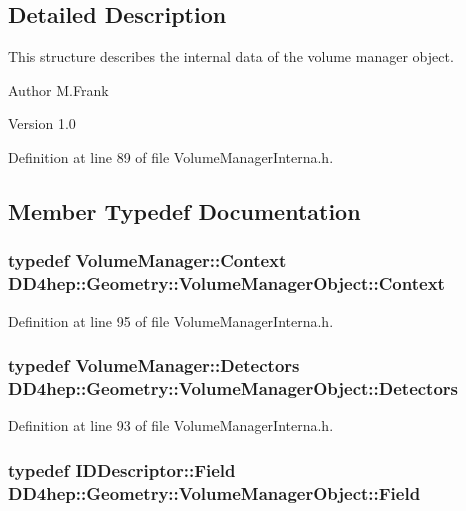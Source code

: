 \subsection{Detailed Description}
This structure describes the internal data of the volume manager object. \begin{DoxyAuthor}{Author}
M.Frank 
\end{DoxyAuthor}
\begin{DoxyVersion}{Version}
1.0 
\end{DoxyVersion}


Definition at line 89 of file VolumeManagerInterna.h.

\subsection{Member Typedef Documentation}
\hypertarget{class_d_d4hep_1_1_geometry_1_1_volume_manager_object_ac975f498c99a0933b0b5911d4fb721b3}{
\subsubsection[{Context}]{\setlength{\rightskip}{0pt plus 5cm}typedef {\bf VolumeManager::Context} {\bf DD4hep::Geometry::VolumeManagerObject::Context}}}
\label{class_d_d4hep_1_1_geometry_1_1_volume_manager_object_ac975f498c99a0933b0b5911d4fb721b3}


Definition at line 95 of file VolumeManagerInterna.h.\hypertarget{class_d_d4hep_1_1_geometry_1_1_volume_manager_object_a3148ed79d5f6e5175060519838dbad38}{
\subsubsection[{Detectors}]{\setlength{\rightskip}{0pt plus 5cm}typedef {\bf VolumeManager::Detectors} {\bf DD4hep::Geometry::VolumeManagerObject::Detectors}}}
\label{class_d_d4hep_1_1_geometry_1_1_volume_manager_object_a3148ed79d5f6e5175060519838dbad38}


Definition at line 93 of file VolumeManagerInterna.h.\hypertarget{class_d_d4hep_1_1_geometry_1_1_volume_manager_object_ab214e2fe7df311a4a2e87ec17958790c}{
\subsubsection[{Field}]{\setlength{\rightskip}{0pt plus 5cm}typedef {\bf IDDescriptor::Field} {\bf DD4hep::Geometry::VolumeManagerObject::Field}}}
\label{class_d_d4hep_1_1_geometry_1_1_volume_manager_object_ab214e2fe7df311a4a2e87ec17958790c}



